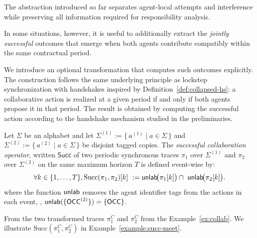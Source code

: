    The abstraction introduced so far separates agent-local attempts and interference while preserving all information required for responsibility analysis.

    In some situations, however, it is useful to additionally extract the \emph{jointly successful} outcomes that emerge when both agents contribute compatibly within the same contractual period.

     We introduce an optional transformation that computes such outcomes explicitly. The construction follows the same underlying principle as lockstep synchronization with handshakes  inspired by Definition~\ref{def:collapsed-hs}: a collaborative action is realized at a given period if and only if both agents propose it in that period. The result is obtained by computing the successful action according to the handshake mechanism studied in the preliminaries. 
  \begin{definition}\label{successcomb}
  Let  $\Sigma$ be an alphabet and let $\Sigma^{(1)}:=\{\,a^{(1)}\mid a\in\Sigma\,\}$ and
  $\Sigma^{(2)}:=\{\,a^{(2)}\mid a\in\Sigma\,\}$ be disjoint tagged copies.
  The \emph{successful collaboration operator}, written $\mathsf{Succ}$ of two periodic synchronous traces $\pi_1$ over $\Sigma^{(1)}$ and $\pi_2$ over $\Sigma^{(2)}$ on the same maximum horizon $T$ is defined event-wise by:
  \[\forall k\in\{1,\dots,T\},
  \mathrm{Succ}(\pi_1,\pi_2)[k]
  \ := \unlab\!\big(\pi_1[k]\big) \cap\ \unlab\!\big(\pi_2[k]\big).
  \]
  where the function $\mathsf{unlab}$ removes the agent identifier tags from the actions in each event, \eg,  $\mathsf{unlab}(\{\mathsf{OCC}^{(2)}\})=\{\mathsf{OCC}\}$.
  \end{definition}
  \begin{example}
  From the two transformed traces  $\pi_1^{C}$ and $\pi_2^{C}$ from the Example~\ref{ex:collab}.
  We illustrate \(\mathrm{Succ}(\pi_1^{C},\pi_2^{C})\) in Example~\ref{example:succ-meet}.
  \end{example}

